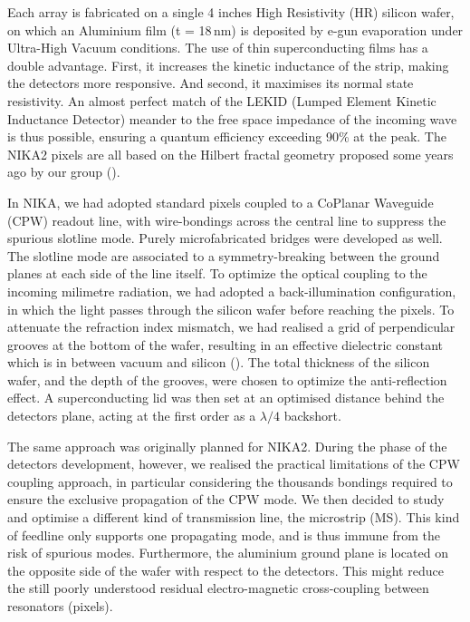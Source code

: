 \documentclass[]{aa} %
\begin{document}
Each array is fabricated on a single 4 inches High Resistivity (HR) silicon wafer, on which an Aluminium film (t = 18\,nm) is deposited by e-gun evaporation under Ultra-High Vacuum conditions. The use of thin superconducting films has a double advantage. First, it increases the kinetic inductance of the strip, making the detectors more responsive. And second, it maximises its normal state resistivity. An almost perfect match of the LEKID (Lumped Element Kinetic Inductance Detector) meander to the free space impedance of the incoming wave is thus possible, ensuring a quantum efficiency exceeding 90\% at the peak. The NIKA2 pixels are all based on the Hilbert fractal geometry proposed some years ago by our group (\cite{Roesch2012}). 

In NIKA, we had adopted standard pixels coupled to a CoPlanar Waveguide (CPW) readout line, with wire-bondings across the central line to suppress the spurious slotline mode. Purely microfabricated bridges were developed as well. The slotline mode are associated to a symmetry-breaking between the ground planes at each side of the line itself. To optimize the optical coupling to the incoming milimetre radiation, we had adopted a back-illumination configuration, in which the light passes through the silicon wafer before reaching the pixels. To attenuate the refraction index mismatch, we had realised a grid of perpendicular grooves at the bottom of the wafer, resulting in an effective dielectric constant which is in between vacuum and silicon (\cite{Goupy2016}). The total thickness of the silicon wafer, and the depth of the grooves, were chosen to optimize the anti-reflection effect. A superconducting lid was then set at an optimised distance behind the detectors plane, acting at the first order as a $\lambda/4$ backshort. 

The same approach was originally planned for NIKA2. During the phase of the detectors development, however, we realised the practical limitations of the CPW coupling approach, in particular considering the thousands bondings required to ensure the exclusive propagation of the CPW mode. We then decided to study and optimise a different kind of transmission line, the microstrip (MS). This kind of feedline only supports one propagating mode, and is thus immune from the risk of spurious modes. Furthermore, the aluminium ground plane is located on the opposite side of the wafer with respect to the detectors. This might reduce the still poorly understood residual electro-magnetic cross-coupling between resonators (pixels).
\end{document}
